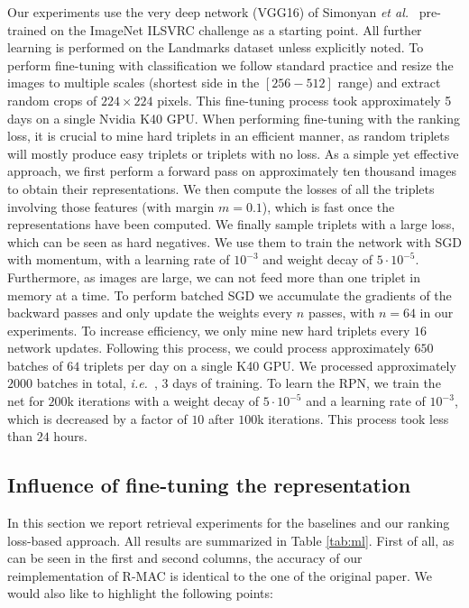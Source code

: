 \documentclass[runningheads]{llncs}
\newcommand{\myparagraph}[1]{\noindent {\bf #1.}}
\def\etal{\emph{et al.}~}
\def\ie{\emph{i.e.}~}
\begin{document}
\myparagraph{Experimental details}
Our experiments use the very deep network (VGG16) of Simonyan \etal \cite{Simonyan2014} pre-trained on the ImageNet ILSVRC challenge as a starting point.
All further learning is performed on the Landmarks dataset unless explicitly noted.
To perform fine-tuning with classification \cite{Babenko2014} we follow standard practice and resize the images to
multiple scales (shortest side in the $\left[256-512\right]$ range) and extract random crops of $224\times 224$ pixels.
This fine-tuning process took approximately 5 days on a single Nvidia K40 GPU.
When performing fine-tuning with the ranking loss, it is crucial to mine hard triplets in an efficient manner, as random triplets will mostly produce easy triplets or triplets with no loss. 
As a simple yet effective approach, we first perform a forward pass on approximately ten thousand images to obtain their
representations. We then compute the losses of all the triplets involving those features (with margin $m=0.1$), which is
fast once the representations have been computed. 
We finally sample triplets with a large loss, which can be seen as hard negatives. We use them to train the network with SGD with momentum, with a learning rate of $10^{-3}$ and weight decay of $5\cdot 10^{-5}$. 
Furthermore, as images are large, we can not feed more than one triplet in memory at a time.
To perform batched SGD we accumulate the gradients of the backward passes and only update the weights every $n$ passes, with $n=64$ in our experiments. 
To increase efficiency, we only mine new hard triplets every $16$ network updates. 
Following this process, we could process approximately $650$ batches of $64$ triplets per day on a single K40 GPU.
We processed approximately $2000$ batches in total, \ie, 3 days of training.
To learn the RPN, we train the net for $200$k iterations with a weight decay of $5\cdot 10^{-5}$ and a learning rate of $10^{-3}$, which is decreased by a factor of $10$ after $100$k iterations.
This process took less than $24$ hours.


\subsection{Influence of fine-tuning the representation}
\label{sec:exp-ml}

In this section we report retrieval experiments for the baselines and our ranking loss-based approach.
All results are summarized in Table \ref{tab:ml}.
First of all, as can be seen in the first and second columns, the accuracy of our reimplementation of R-MAC is
identical to the one of the original paper.  We would also like to highlight the following points:
\end{document}
